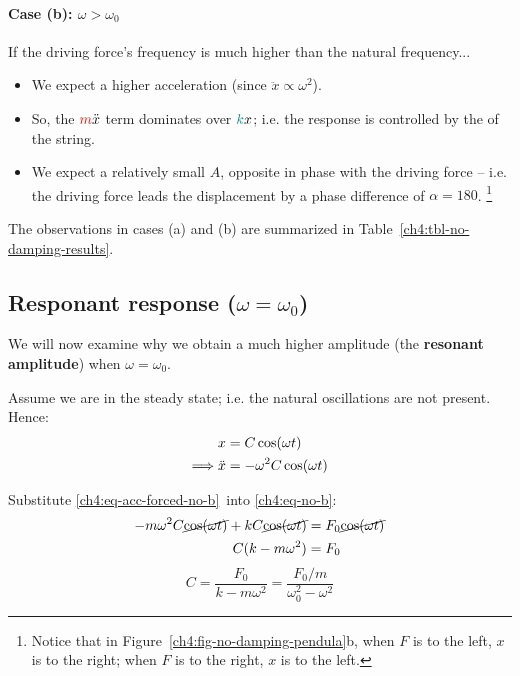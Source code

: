 \paragraph{Case (b): $\omega > \omega_0$}
If the driving force's frequency is much higher than the natural frequency...
\begin{itemize}
	\item We expect a higher acceleration (since $\ddot{x} \propto \omega^2$).
	\item So, the $\textcolor{red}{m}\ddot{x}$ term dominates over $\textcolor{teal}{k}x$; i.e. the response is controlled by the  of the string.
	\item We expect a relatively small $A$, opposite in phase with the driving force -- i.e. the driving force leads the displacement by a phase difference of $\alpha=180$.%
	\footnote{Notice that in Figure~\ref{ch4:fig-no-damping-pendula}b, when $F$ is to the left, $x$ is to the right; when $F$ is to the right, $x$ is to the left.}
\end{itemize}

The observations in cases (a) and (b) are summarized in Table~\ref{ch4:tbl-no-damping-results}.



\subsection{Responant response ($\omega = \omega_0$)}

We will now examine why we obtain a much higher amplitude (the \textbf{resonant amplitude}) when $\omega = \omega_0$.

Assume we are in the steady state; i.e. the natural oscillations are not present. Hence:
\begin{align}
	x &= C\cos(\omega t) \notag \\
	\Longrightarrow
	\ddot{x} &= -\omega^2 C\cos(\omega t)	\label{ch4:eq-acc-forced-no-b}
\end{align}

Substitute \eqref{ch4:eq-acc-forced-no-b} into \eqref{ch4:eq-no-b}:
\begin{align*}
	-m\omega^2 C\cancel{\cos(\omega t)} + kC\cancel{\cos(\omega t)} &= F_0\cancel {\cos(\omega t)} \\
	C(k-m\omega^2) &= F_0
\end{align*}
\begin{equation*}
	 C = \frac{F_0}{k-m\omega^2} = \frac{F_0/m}{\omega_0^2-\omega^2} 
\end{equation*}

